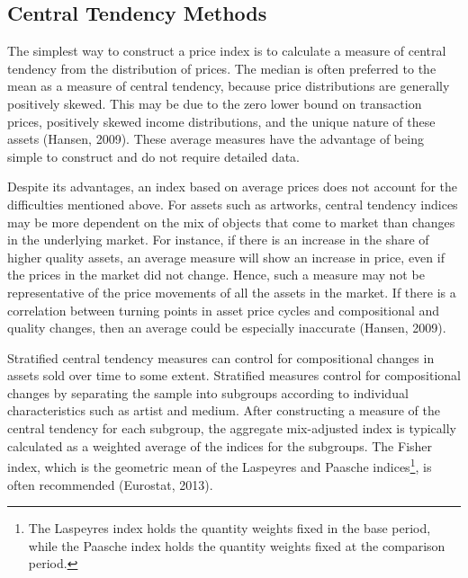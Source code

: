 \documentclass[12pt,]{article}
\let\rmarkdownfootnote\footnote%
\def\footnote{\protect\rmarkdownfootnote}
\begin{document}
\subsection{Central Tendency Methods}\label{central-tendency-methods}

The simplest way to construct a price index is to calculate a measure of
central tendency from the distribution of prices. The median is often
preferred to the mean as a measure of central tendency, because price
distributions are generally positively skewed. This may be due to the
zero lower bound on transaction prices, positively skewed income
distributions, and the unique nature of these assets (Hansen, 2009).
These average measures have the advantage of being simple to construct
and do not require detailed data.

Despite its advantages, an index based on average prices does not
account for the difficulties mentioned above. For assets such as
artworks, central tendency indices may be more dependent on the mix of
objects that come to market than changes in the underlying market. For
instance, if there is an increase in the share of higher quality assets,
an average measure will show an increase in price, even if the prices in
the market did not change. Hence, such a measure may not be
representative of the price movements of all the assets in the market.
If there is a correlation between turning points in asset price cycles
and compositional and quality changes, then an average could be
especially inaccurate (Hansen, 2009).

Stratified central tendency measures can control for compositional
changes in assets sold over time to some extent. Stratified measures
control for compositional changes by separating the sample into
subgroups according to individual characteristics such as artist and
medium. After constructing a measure of the central tendency for each
subgroup, the aggregate mix-adjusted index is typically calculated as a
weighted average of the indices for the subgroups. The Fisher index,
which is the geometric mean of the Laspeyres and Paasche
indices\footnote{The Laspeyres index holds the quantity weights fixed in
  the base period, while the Paasche index holds the quantity weights
  fixed at the comparison period.}, is often recommended (Eurostat,
2013).
\end{document}
